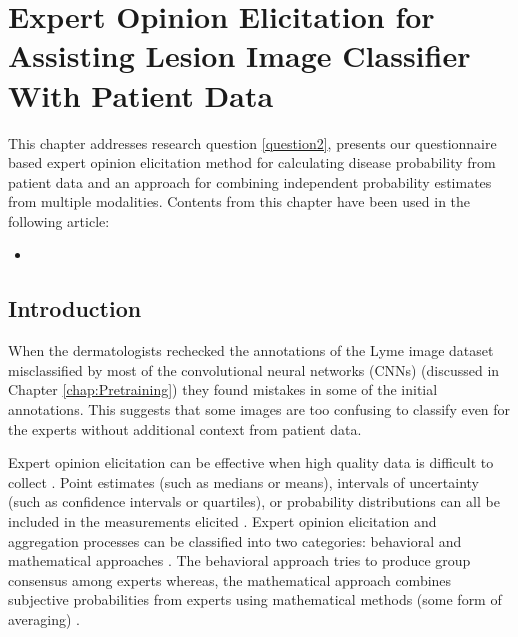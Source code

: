 \chapter{Expert Opinion Elicitation for Assisting Lesion Image Classifier With Patient Data}\label{chap:Elicitation}

\begin{center}
	\begin{minipage}{0.8\textwidth}
		\begin{small}
			This chapter addresses research question \ref{question2}, presents our questionnaire based expert opinion elicitation method for calculating disease probability from patient data and an approach for combining independent probability estimates from multiple modalities. Contents from this chapter have been used in the following article:
			\begin{itemize}
				\item {}
			\end{itemize}  
		\end{small}
	\end{minipage}
	\vspace{0.5cm}
\end{center}

\minitoc

\section{Introduction}
When the dermatologists rechecked the annotations of the Lyme image dataset misclassified by most of the convolutional neural networks (CNNs) (discussed in Chapter \ref{chap:Pretraining}) they found mistakes in some of the initial annotations. This suggests that some images are too confusing to classify even for the experts without additional context from patient data.

Expert opinion elicitation can be effective when high quality data is difficult to collect \cite{Wilson2018}. Point estimates (such as medians or means), intervals of uncertainty (such as confidence intervals or quartiles), or probability distributions can all be included in the measurements elicited \cite{cadham2022use}. Expert opinion elicitation and aggregation processes can be classified into two categories: behavioral and mathematical approaches \cite{Clemen1999, cadham2022use}. The behavioral approach tries to produce group consensus among experts whereas, the mathematical approach combines subjective probabilities from experts using mathematical methods (some form of averaging) \cite{cadham2022use}.

